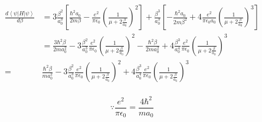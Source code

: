 \documentclass[12pt]{article}
\begin{document}
\begin{equation*}
    \begin{split}
        \frac{d\left\langle \psi \left| H \right| \psi\right\rangle}{d\beta} & =
        3 \frac{\beta^2}{a_0^3} \left[\frac{\hbar^2 a_0}{2m \beta} - \frac{e^2}{\pi \epsilon_0}\left(\frac{1}{\mu+2\frac{\beta}{a_0}}\right)^2 \right]
        + \frac{\beta^3}{a_0^3} \left[-\frac{\hbar^2 a_0}{2m \beta^2} + 4 \frac{e^2}{\pi \epsilon_0 a_0}\left(\frac{1}{\mu+2\frac{\beta}{a_0}}\right)^3 \right]                                                                                                                                                                                            \\
                                                                             & = \frac{3 \hbar^2 \beta}{2m a_0^2} - 3 \frac{\beta^2}{a_0^3} \frac{e^2}{\pi \epsilon_0}\left(\frac{1}{\mu+2\frac{\beta}{a_0}}\right)^2 - \frac{\hbar^2 \beta}{2m a_0^2} + 4 \frac{\beta^3}{a_0^4} \frac{e^2}{\pi \epsilon_0}\left(\frac{1}{\mu+2\frac{\beta}{a_0}}\right)^3 \\
        =                                                                    & \frac{\hbar^2 \beta}{m a_0^2} - 3 \frac{\beta^2}{a_0^3} \frac{e^2}{\pi \epsilon_0}\left(\frac{1}{\mu+2\frac{\beta}{a_0}}\right)^2 + 4 \frac{\beta^3}{a_0^4} \frac{e^2}{\pi \epsilon_0}\left(\frac{1}{\mu+2\frac{\beta}{a_0}}\right)^3                                       \\
    \end{split}
\end{equation*}

\[\because \frac{e^2}{\pi \epsilon_0} = \frac{4 \hbar^2}{m a_0}\]
\end{document}
